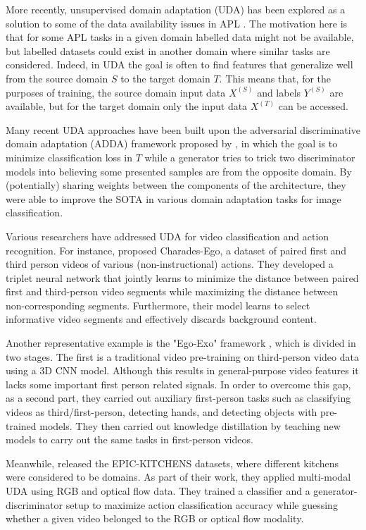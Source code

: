 \documentclass[final]{cvpr}
\begin{document}
More recently, unsupervised domain adaptation (UDA) has been explored as a solution to some of the data availability issues in APL \cite{Munro2020-ui}. The motivation here is that for some APL tasks in a given domain labelled data might not be available, but labelled datasets could exist in another domain where similar tasks are considered. Indeed, in UDA the goal is often to find features that generalize well from the source domain $S$ to the target domain $T$. This means that, for the purposes of training, the source domain input data $X^{(S)}$ and labels $Y^{(S)}$ are available, but for the target domain only the input data $X^{(T)}$ can be accessed.

Many recent UDA approaches \cite{Munro2020-ui, Zhang2020-om} have been built upon the adversarial discriminative domain adaptation (ADDA) framework proposed by \cite{Tzeng2017-dw}, in which the goal is to minimize classification loss in $T$ while a generator tries to trick two discriminator models into believing some presented samples are from the opposite domain. By (potentially) sharing weights between the components of the architecture, they were able to improve the SOTA in various domain adaptation tasks for image classification.

Various researchers have addressed UDA for video classification and action recognition. For instance, \cite{Sigurdsson2018-gk} proposed Charades-Ego, a dataset of paired first and third person videos of various (non-instructional) actions. They developed a triplet neural network that jointly learns to minimize the distance between paired first and third-person video segments while maximizing the distance between non-corresponding segments. Furthermore, their model learns to select informative video segments and effectively discards background content.

Another representative example is the "Ego-Exo" framework \cite{Li2021-mf}, which is divided in two stages. The first is a traditional video pre-training on third-person video data using a 3D CNN model. Although this results in general-purpose video features it lacks some important first person related signals. In order to overcome this gap, as a second part, they carried out auxiliary first-person tasks such as classifying videos as third/first-person, detecting hands, and detecting objects with pre-trained models. They then carried out knowledge distillation by teaching new models to carry out the same tasks in first-person videos.


Meanwhile, \cite{Munro2020-ui} released the EPIC-KITCHENS datasets, where different kitchens were considered to be domains. As part of their work, they applied multi-modal UDA using RGB and optical flow data. They trained a classifier and a generator-discriminator setup to maximize action classification accuracy while guessing whether a given video belonged to the RGB or optical flow modality. 
\end{document}
